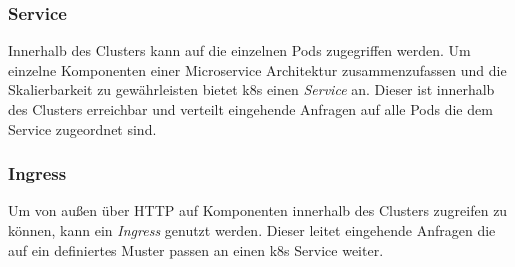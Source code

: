 \subsubsection{Service}
Innerhalb des Clusters kann auf die einzelnen Pods zugegriffen werden.
Um einzelne Komponenten einer Microservice Architektur zusammenzufassen und die Skalierbarkeit zu gewährleisten bietet \ac{k8s} einen \textit{Service} an.
Dieser ist innerhalb des Clusters erreichbar und verteilt eingehende Anfragen auf alle Pods die dem Service zugeordnet sind.

\subsubsection{Ingress}
Um von außen über HTTP auf Komponenten innerhalb des Clusters zugreifen zu können, kann ein \textit{Ingress} genutzt werden.
Dieser leitet eingehende Anfragen die auf ein definiertes Muster passen an einen \ac{k8s} Service weiter.
